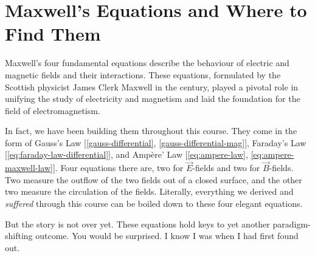 \documentclass[12pt,b4paper]{article}
\begin{document}
\section{Maxwell's Equations and Where to Find Them}
Maxwell's four fundamental equations describe the behaviour of electric and magnetic fields and their interactions. These equations, formulated by the Scottish physicist James Clerk Maxwell in the  century, played a pivotal role in unifying the study of electricity and magnetism and laid the foundation for the field of electromagnetism.

In fact, we have been building them throughout this course. They come in the form of Gauss's Law [\ref{gauss-differential}, \ref{gauss-differential-mag}], Faraday's Law [\ref{eq:faraday-law-differential}], and Ampère' Law [\ref{eq:ampere-law}, \ref{eq:ampere-maxwell-law}]. Four equations there are, two for $\vec{E}$-fields and two for $\vec{B}$-fields. Two measure the outflow of the two fields out of a closed surface, and the other two measure the circulation of the fields. Literally, everything we derived and \textit{suffered} through this course can be boiled down to these four elegant equations. 

But the story is not over yet. These equations hold keys to yet another paradigm-shifting outcome. You would be surprised. I know I was when I had first found out.
\end{document}

